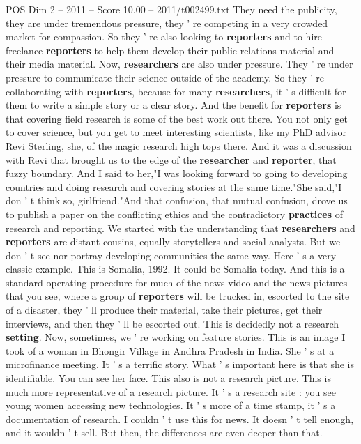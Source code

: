 \begin{textsample}{POS Dim 2 – 2011 – Score 10.00 – 2011/t002499.txt}
They need the publicity, they are under tremendous pressure, they ' re competing in a very crowded market for compassion.
So they ' re also looking to \textbf{reporters} and to hire freelance \textbf{reporters} to help them develop their public relations material and their media material.
Now, \textbf{researchers} are also under pressure.
They ' re under pressure to communicate their science outside of the academy.
So they ' re collaborating with \textbf{reporters}, because for many \textbf{researchers}, it ' s difficult for them to write a simple story or a clear story.
And the benefit for \textbf{reporters} is that covering field research is some of the best work out there.
You not only get to cover science, but you get to meet interesting scientists, like my PhD advisor Revi Sterling, she, of the magic research high tops there.
And it was a discussion with Revi that brought us to the edge of the \textbf{researcher} and \textbf{reporter}, that fuzzy boundary.
And I said to her,"I was looking forward to going to developing countries and doing research and covering stories at the same time."She said,"I don ' t think so, girlfriend."And that confusion, that mutual confusion, drove us to publish a paper on the conflicting ethics and the contradictory \textbf{practices} of research and reporting.
We started with the understanding that \textbf{researchers} and \textbf{reporters} are distant cousins, equally storytellers and social analysts.
But we don ' t see nor portray developing communities the same way.
Here ' s a very classic example.
This is Somalia, 1992.
It could be Somalia today.
And this is a standard operating procedure for much of the news video and the news pictures that you see, where a group of \textbf{reporters} will be trucked in, escorted to the site of a disaster, they ' ll produce their material, take their pictures, get their interviews, and then they ' ll be escorted out.
This is decidedly not a research \textbf{setting}.
Now, sometimes, we ' re working on feature stories.
This is an image I took of a woman in Bhongir Village in Andhra Pradesh in India.
She ' s at a microfinance meeting.
It ' s a terrific story.
What ' s important here is that she is identifiable.
You can see her face.
This also is not a research picture.
This is much more representative of a research picture.
It ' s a research site : you see young women accessing new technologies.
It ' s more of a time stamp, it ' s a documentation of research.
I couldn ' t use this for news.
It doesn ' t tell enough, and it wouldn ' t sell.
But then, the differences are even deeper than that.

\end{textsample}
